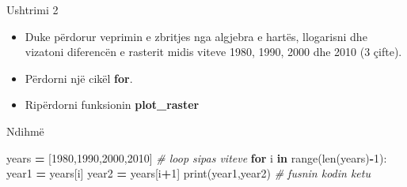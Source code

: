 \documentclass[
  ignorenonframetext,
]{beamer}
\newenvironment{Shaded}{\begin{snugshade}}{\end{snugshade}}
\newcommand{\BuiltInTok}[1]{#1}
\newcommand{\CommentTok}[1]{\textcolor[rgb]{0.56,0.35,0.01}{\textit{#1}}}
\newcommand{\ControlFlowTok}[1]{\textcolor[rgb]{0.13,0.29,0.53}{\textbf{#1}}}
\newcommand{\DecValTok}[1]{\textcolor[rgb]{0.00,0.00,0.81}{#1}}
\newcommand{\KeywordTok}[1]{\textcolor[rgb]{0.13,0.29,0.53}{\textbf{#1}}}
\newcommand{\NormalTok}[1]{#1}
\newcommand{\OperatorTok}[1]{\textcolor[rgb]{0.81,0.36,0.00}{\textbf{#1}}}
\begin{document}
\begin{frame}{Ushtrimi 2}
\protect\hypertarget{ushtrimi-2}{}
\begin{itemize}
\item
  Duke përdorur veprimin e zbritjes nga algjebra e hartës, llogarisni
  dhe vizatoni diferencën e rasterit midis viteve 1980, 1990, 2000 dhe
  2010 (3 çifte).
\item
  Përdorni një cikël \textbf{for}.
\item
  Ripërdorni funksionin \textbf{plot\_raster}
\end{itemize}
\end{frame}

\begin{frame}[fragile]{Ndihmë}
\protect\hypertarget{ndihmuxeb}{}

\begin{Shaded}
\begin{Highlighting}[]
\NormalTok{years }\OperatorTok{=}\NormalTok{ [}\DecValTok{1980}\NormalTok{,}\DecValTok{1990}\NormalTok{,}\DecValTok{2000}\NormalTok{,}\DecValTok{2010}\NormalTok{]}
\CommentTok{\# loop sipas viteve}
\ControlFlowTok{for}\NormalTok{ i }\KeywordTok{in} \BuiltInTok{range}\NormalTok{(}\BuiltInTok{len}\NormalTok{(years)}\OperatorTok{{-}}\DecValTok{1}\NormalTok{):}
\NormalTok{    year1 }\OperatorTok{=}\NormalTok{ years[i]}
\NormalTok{    year2 }\OperatorTok{=}\NormalTok{ years[i}\OperatorTok{+}\DecValTok{1}\NormalTok{]}
    \BuiltInTok{print}\NormalTok{(year1,year2)}
    \CommentTok{\# fusnin kodin ketu}
\end{Highlighting}
\end{Shaded}
\end{frame}
\end{document}
